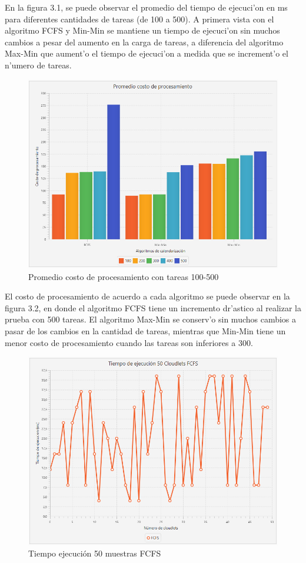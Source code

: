 En la figura 3.1, se puede observar el promedio del tiempo de ejecuci'on en ms para diferentes cantidades de tareas (de 100 a 500). A primera vista con el algoritmo FCFS y Min-Min se mantiene un tiempo de ejecuci'on sin muchos cambios a pesar del aumento en la carga de tareas, a diferencia del algoritmo Max-Min que aument'o el tiempo de ejecuci'on a medida que se increment'o el n'umero de tareas.

\begin{figure}
	\caption{Promedio costo de procesamiento con tareas 100-500}
	\centering
	\includegraphics[scale=0.5]{media/costoproce}
\end{figure}

\bigskip
El costo de procesamiento de acuerdo a cada algoritmo se puede observar en la figura 3.2, en donde el algoritmo FCFS tiene un incremento dr'astico al realizar la prueba con 500 tareas. El algoritmo Max-Min se conserv'o sin muchos cambios a pasar de los cambios en la cantidad de tareas, mientras que Min-Min tiene un menor costo de procesamiento cuando las tareas son inferiores a 300.

\begin{figure}
	\caption{Tiempo ejecución 50 muestras FCFS}
	\centering
	\includegraphics[scale=0.5]{media/fcfs}
\end{figure}

